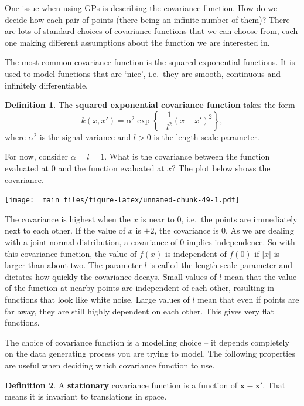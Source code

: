 \documentclass[
]{book}
\theoremstyle{definition}
\newtheorem{definition}{Definition}[chapter]
\theoremstyle{definition}
\theoremstyle{definition}
\theoremstyle{definition}
\theoremstyle{remark}
\begin{document}
One issue when using GPs is describing the covariance function. How do we decide how each pair of points (there being an infinite number of them)? There are lots of standard choices of covariance functions that we can choose from, each one making different assumptions about the function we are interested in.

The most common covariance function is the squared exponential functions. It is used to model functions that are `nice', i.e.~they are smooth, continuous and infinitely differentiable.

\begin{definition}
The \textbf{squared exponential covariance function} takes the form
\[
k(x, x') = \alpha^2\exp\left\{-\frac{1}{l^2}(x-x')^2\right\},
\]
where \(\alpha^2\) is the signal variance and \(l>0\) is the length scale parameter.
\end{definition}

For now, consider \(\alpha = l = 1\). What is the covariance between the function evaluated at 0 and the function evaluated at \(x\)? The plot below shows the covariance.

\texttt{[image: \_main\_files/figure-latex/unnamed-chunk-49-1.pdf]}

The covariance is highest when the \(x\) is near to 0, i.e.~the points are immediately next to each other. If the value of \(x\) is \(\pm 2\), the covariance is 0. As we are dealing with a joint normal distribution, a covariance of 0 implies independence. So with this covariance function, the value of \(f(x)\) is independent of \(f(0)\) if \(|x|\) is larger than about two. The parameter \(l\) is called the length scale parameter and dictates how quickly the covariance decays. Small values of \(l\) mean that the value of the function at nearby points are independent of each other, resulting in functions that look like white noise. Large values of \(l\) mean that even if points are far away, they are still highly dependent on each other. This gives very flat functions.

The choice of covariance function is a modelling choice -- it depends completely on the data generating process you are trying to model. The following properties are useful when deciding which covariance function to use.

\begin{definition}
A \textbf{stationary} covariance function is a function of \(\boldsymbol{x} - \boldsymbol{x}'\). That means it is invariant to translations in space.
\end{definition}
\end{document}
